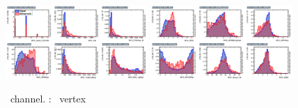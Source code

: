\begin{figure}[htbp]
	\includegraphics[width=0.48\textwidth]{6_Search/Figures/MVAtechnics/toppairzct/uue/variables_id_c1.png}
	\includegraphics[width=0.48\textwidth]{6_Search/Figures/MVAtechnics/toppairzct/uue/variables_id_c2.png}
	\caption{\emumu\ channel. \TTSR: \Zct\ vertex }
	\label{image:Figuresuuetoppairzct}
\end{figure}


